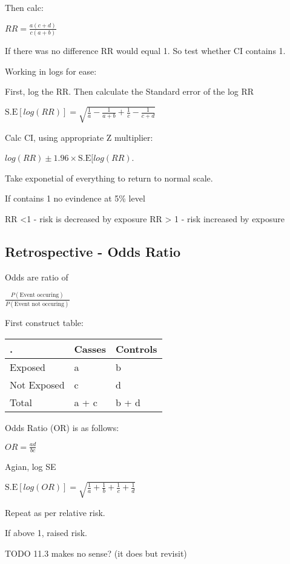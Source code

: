 \documentclass[
  letterpaper,
  DIV=11,
  numbers=noendperiod]{scrreprt}
\begin{document}
Then calc:

\(RR = \frac{a(c+d)}{c(a+b)}\)

If there was no difference RR would equal 1. So test whether CI contains
1.

Working in logs for ease:

First, log the RR. Then calculate the Standard error of the log RR

\(\text{S.E}[log(RR)] = \sqrt{  \frac{1}{a} -  \frac{1}{a+b}+  \frac{1}{c}-  \frac{1}{c+d} }\)

Calc CI, using appropriate Z multiplier:

\(log(RR) \pm 1.96 \times \text{S.E}[log(RR)\).

Take exponetial of everything to return to normal scale.

If contains 1 no evindence at 5\% level

RR \textless1 - risk is decreased by exposure RR \textgreater{} 1 - risk
increased by exposure

\hypertarget{retrospective---odds-ratio}{%
\subsection{Retrospective - Odds
Ratio}\label{retrospective---odds-ratio}}

Odds are ratio of

\(\frac{P(\text{Event occuring})}{P(\text{Event not occuring})}\)

First construct table:

\begin{longtable}[]{@{}lll@{}}
\toprule()
. & Casses & Controls \\
\midrule()
\endhead
Exposed & a & b \\
Not Exposed & c & d \\
Total & a + c & b + d \\
\bottomrule()
\end{longtable}

Odds Ratio (OR) is as follows:

\(OR = \frac{ad}{bc}\)

Agian, log SE

\(\text{S.E}[log(OR)] = \sqrt{  \frac{1}{a} +  \frac{1}{b}+  \frac{1}{c}+  \frac{1}{d} }\)

Repeat as per relative risk.

If above 1, raised risk.

TODO 11.3 makes no sense? (it does but revisit)
\end{document}
